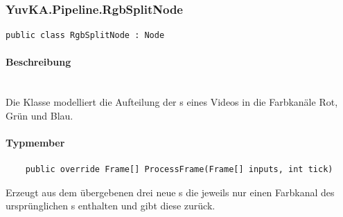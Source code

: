 \subsubsection{YuvKA.Pipeline.RgbSplitNode}

\begin{verbatim}
public class RgbSplitNode : Node
\end{verbatim}

\paragraph{Beschreibung}~\\
Die Klasse  modelliert die Aufteilung der s eines Videos in die Farbkanäle Rot, Grün und Blau.

\paragraph{Typmember}
\begin{itemize}

	\begin{verbatim}
	public override Frame[] ProcessFrame(Frame[] inputs, int tick)
	\end{verbatim}
	Erzeugt aus dem übergebenen  drei neue s die jeweils nur einen Farbkanal des ursprünglichen s enthalten und gibt diese zurück.
	
\end{itemize}
